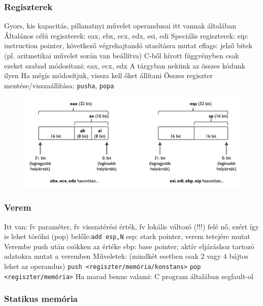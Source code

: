 \documentclass[12pt,a4paper]{article}
\begin{document}
\subsubsection{Regiszterek}

\begin{outline}
	\1 Gyors, kis kapacitás, pillanatnyi művelet operandusai itt vannak általában
	\1 Általános célú regiszterek: eax, ebx, ecx, edx, esi, edi
	\1 Speciális regiszterek:
		\2 eip: instruction pointer, következő végrehajtandó utasításra mutat
		\2 eflags: jelző bitek (pl. aritmetikai művelet során van beállítva)
	\1 C-ből hívott függvényben csak ezeket szabad módosítani: eax, ecx, edx
		\2 A tárgyban nekünk az összes kódunk ilyen
		\2 Ha mégis módosítjuk, vissza kell őket állítani
		\2 Összes regiszter mentése/visszaállítása: \texttt{pusha}, \texttt{popa}
\end{outline}

\begin{figure}[h!]
	\centering
	\includegraphics[width=0.65\linewidth]{regiszterek-szerkezete}
\end{figure}

\subsubsection{Verem}

\begin{outline}
	\1 Itt van: fv paraméter, fv visszatérési érték, fv lokális változó (!!!)
	 felé nő, ezért így is lehet törölni (pop) belőle:\texttt{add esp,N}
	\1 esp: stack pointer, verem tetejére mutat
		\2 Verembe push után csökken az értéke
	\1 ebp: base pointer; aktív eljáráshoz tartozó adatokra mutat a veremben
	\1 Műveletek: (mindkét esetben csak 2 vagy 4 bájtos lehet az operandus)
		\2 \texttt{push <regiszter/memória/konstans>}
		\2 \texttt{pop <regiszter/memória>}
	\1 Ha marad benne valami: C program általában segfault-ol
\end{outline}

\pagebreak

\subsubsection{Statikus memória}
\end{document}
